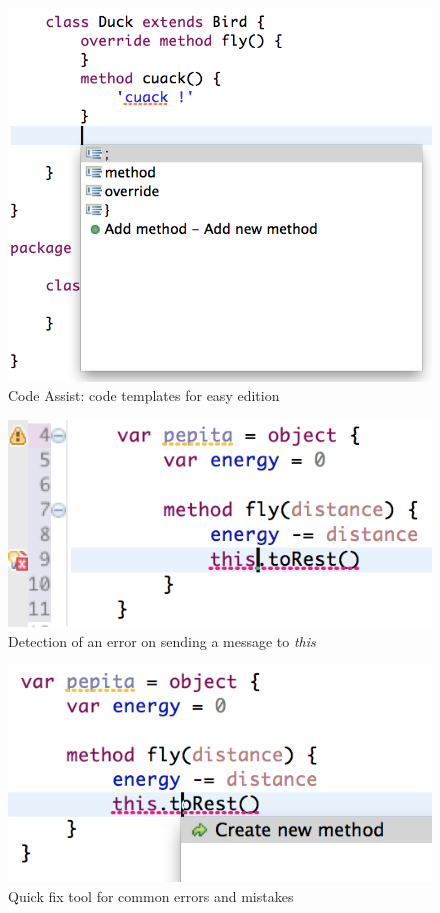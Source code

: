 \begin{figure}[ht]
    \centering
	\includegraphics[scale=0.5]{images/wollok-paper-codetemplates.png}
    \caption{Code Assist: code templates for easy edition}
    \label{fig:codetemplates.png}
\end{figure}

\begin{figure}[ht]
    \centering
	\includegraphics[scale=0.5]{images/wollok-paper-check-noMethodOnThis.png}
    \caption{Detection of an error on sending a message to \emph{this}}
    \label{fig:check-noMethodOnThis.png}
\end{figure}

\begin{figure}[ht]
    \centering
	\includegraphics[scale=0.5]{images/wollok-paper-quickfix.png}
    \caption{Quick fix tool for common errors and mistakes}
    \label{fig:quickfix.png}
\end{figure}

